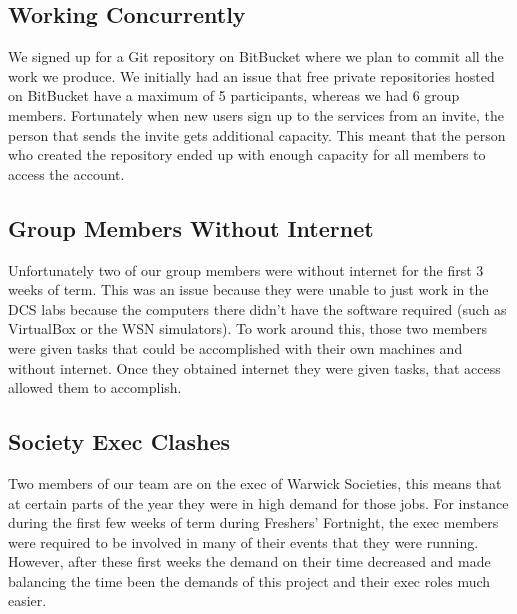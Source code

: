 \subsection{Working Concurrently}

We signed up for a Git repository on BitBucket \cite{?} where we plan to commit all the work we produce. We initially had an issue that free private repositories hosted on BitBucket have a maximum of 5 participants, whereas we had 6 group members. Fortunately when new users sign up to the services from an invite, the person that sends the invite gets additional capacity. This meant that the person who created the repository ended up with enough capacity for all members to access the account.

\subsection{Group Members Without Internet}
Unfortunately two of our group members were without internet for the first 3 weeks of term. This was an issue because they were unable to just work in the DCS labs because the computers there didn't have the software required (such as VirtualBox or the WSN simulators). To work around this, those two members were given tasks that could be accomplished with their own machines and without internet. Once they obtained internet they were given tasks, that access allowed them to accomplish.

\subsection{Society Exec Clashes}
Two members of our team are on the exec of Warwick Societies, this means that at certain parts of the year they were in high demand for those jobs. For instance during the first few weeks of term during Freshers' Fortnight, the exec members were required to be involved in many of their events that they were running. However, after these first weeks the demand on their time decreased and made balancing the time been the demands of this project and their exec roles much easier.


